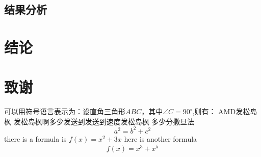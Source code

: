 \documentclass{article}%
\newcommand\degree{^\circ}
\begin{document}
    \subsection{结果分析}
    \section{结论}
    \section{致谢}
    可以用符号语言表示为：设直角三角形$ABC$，其中$\angle C=90\degree$,则有：
    AMD发松岛枫
        发松岛枫啊多少发送到发送到速度发松岛枫
    多少分撒旦法
    \begin{equation}
    a^2=b^2+c^2
    \end{equation}
    there is a formula is $f(x)=x^2+3x$
    here is another formula $$f(x)=x^3+x^5$$
\end{document}

